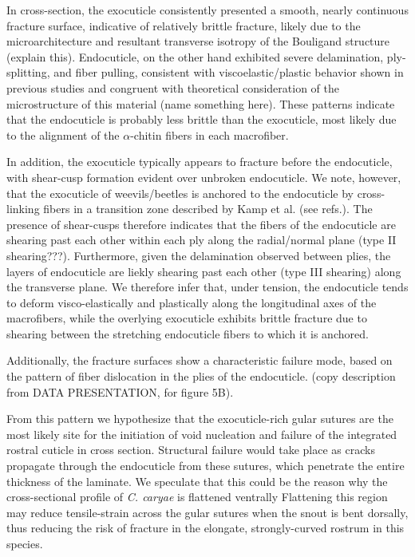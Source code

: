 \documentclass[twocolumn, linenumbers, superscriptaddress]{revtex4-1}
\begin{document}
			In cross-section, the exocuticle consistently presented a smooth, nearly continuous fracture surface, indicative of relatively brittle fracture, likely due to the microarchitecture and resultant transverse isotropy of the Bouligand structure (explain this).
			Endocuticle, on the other hand exhibited severe delamination, ply-splitting, and fiber pulling, consistent with viscoelastic/plastic behavior shown in previous studies and congruent with theoretical consideration of the microstructure of this material (name something here). 
			These patterns indicate that the endocuticle is probably less brittle than the exocuticle, most likely due to the alignment of the $\alpha$-chitin fibers in each macrofiber.
			
			In addition, the exocuticle typically appears to fracture before the endocuticle, with shear-cusp formation evident over unbroken endocuticle.
			We note, however, that the exocuticle of weevils/beetles is anchored to the endocuticle by cross-linking fibers in a transition zone described by Kamp et al. (see refs.).
			The presence of shear-cusps therefore indicates that the fibers of the endocuticle are shearing past each other within each ply along the radial/normal plane (type II shearing???).
			Furthermore, given the delamination observed between plies, the layers of endocuticle are liekly shearing past each other (type III shearing) along the transverse plane.
			We therefore infer that, under tension, the endocuticle tends to deform visco-elastically and plastically along the longitudinal axes of the macrofibers, while the overlying exocuticle exhibits brittle fracture due to shearing between the stretching endocuticle fibers to which it is anchored.
			
			Additionally, the fracture surfaces show a characteristic failure mode, based on the pattern of fiber dislocation in the plies of the endocuticle.
			(copy description from DATA PRESENTATION, for figure 5B).
			
			From this pattern we hypothesize that the exocuticle-rich gular sutures are the most likely site for the initiation of void nucleation and failure of the integrated rostral cuticle in cross section.
			Structural failure would take place as cracks propagate through the endocuticle from these sutures, which penetrate the entire thickness of the laminate.
			We speculate that this could be the reason why the cross-sectional profile of \textit{C. caryae} is flattened ventrally
			Flattening this region may reduce tensile-strain across the gular sutures when the snout is bent dorsally, thus reducing the risk of fracture in the elongate, strongly-curved rostrum in this species.
			
\end{document}
